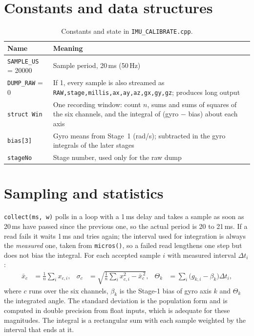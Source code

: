 \documentclass[11pt,a4paper]{report}
\newcommand{\code}[1]{\texttt{#1}}
\begin{document}
\section{Constants and data structures}
\begin{table}[H]
\centering
\caption{Constants and state in \code{IMU\_CALIBRATE.cpp}.}\label{tab:testconst}
\small
\begin{tabular}{@{}lp{10cm}@{}}
\toprule
Name & Meaning\\
\midrule
\code{SAMPLE\_US} = 20000 & Sample period, 20\,ms (50\,Hz)\\
\code{DUMP\_RAW} = 0 & If 1, every sample is also streamed as \code{RAW,stage,millis,ax,ay,az,gx,gy,gz}; produces long output\\
\code{struct Win} & One recording window: count $n$, sums and sums of squares of the six channels, and the integral of (gyro $-$ bias) about each axis\\
\code{bias[3]} & Gyro means from Stage~1 (rad/s); subtracted in the gyro integrals of the later stages\\
\code{stageNo} & Stage number, used only for the raw dump\\
\bottomrule
\end{tabular}
\end{table}

\section{Sampling and statistics}
\code{collect(ms, w)} polls in a loop with a 1\,ms delay and takes a sample as soon as 20\,ms have passed since the previous one, so the actual period is 20 to 21\,ms. If a read fails it waits 1\,ms and tries again; the interval used for integration is always the \emph{measured} one, taken from \code{micros()}, so a failed read lengthens one step but does not bias the integral. For each accepted sample $i$ with measured interval $\Delta t_i$:
\begin{align}
  \bar x_c&=\frac1n\sum_i x_{c,i}, & \sigma_c&=\sqrt{\frac1n\sum_i x_{c,i}^2-\bar x_c^{\,2}}, & \Theta_k&=\sum_i\bigl(g_{k,i}-\beta_k\bigr)\Delta t_i, \label{eq:stats}
\end{align}
where $c$ runs over the six channels, $\beta_k$ is the Stage-1 bias of gyro axis $k$ and $\Theta_k$ the integrated angle. The standard deviation is the population form and is computed in double precision from float inputs, which is adequate for these magnitudes. The integral is a rectangular sum with each sample weighted by the interval that ends at it.
\end{document}
